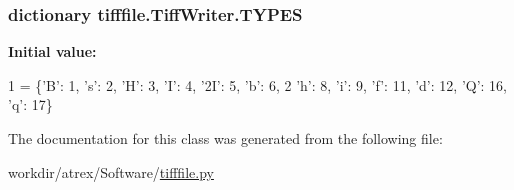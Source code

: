 \hypertarget{classtifffile_1_1_tiff_writer_aae9c1bc9345c95fe80d2d31188e6e23d}{
\subsubsection[{T\-Y\-P\-E\-S}]{\setlength{\rightskip}{0pt plus 5cm}dictionary tifffile.\-Tiff\-Writer.\-T\-Y\-P\-E\-S\hspace{0.3cm}{\ttfamily [static]}}}\label{classtifffile_1_1_tiff_writer_aae9c1bc9345c95fe80d2d31188e6e23d}
{\bfseries Initial value\-:}
\begin{DoxyCode}
1 = \{\textcolor{stringliteral}{'B'}: 1, \textcolor{stringliteral}{'s'}: 2, \textcolor{stringliteral}{'H'}: 3, \textcolor{stringliteral}{'I'}: 4, \textcolor{stringliteral}{'2I'}: 5, \textcolor{stringliteral}{'b'}: 6,
2              \textcolor{stringliteral}{'h'}: 8, \textcolor{stringliteral}{'i'}: 9, \textcolor{stringliteral}{'f'}: 11, \textcolor{stringliteral}{'d'}: 12, \textcolor{stringliteral}{'Q'}: 16, \textcolor{stringliteral}{'q'}: 17\}
\end{DoxyCode}


The documentation for this class was generated from the following file\-:\begin{DoxyCompactItemize}
\item 
workdir/atrex/\-Software/\hyperlink{tifffile_8py}{tifffile.\-py}\end{DoxyCompactItemize}
